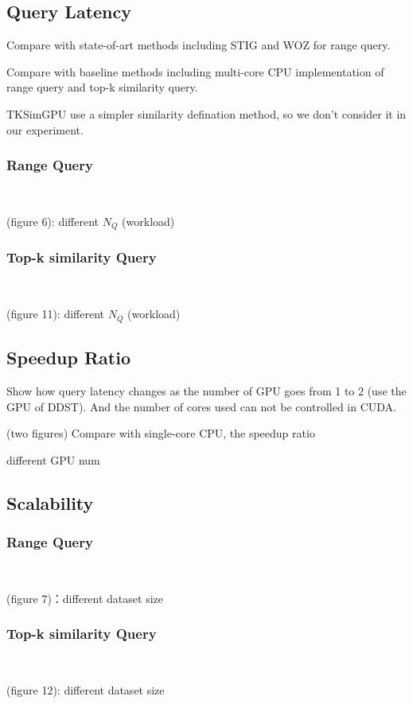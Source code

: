 \documentclass[conference]{IEEEtran}
\begin{document}
\subsection{Query Latency}

Compare with state-of-art methods including STIG and WOZ for range query.

Compare with baseline methods including multi-core CPU implementation of range query and top-k similarity query.

TKSimGPU use a simpler similarity defination method, so we don't consider it in our experiment. 

\subsubsection{Range Query}$  $

(figure 6): different $N_Q$ (workload)

\subsubsection{Top-k similarity Query}$  $

(figure 11): different $N_{Q}$ (workload)

\subsection{Speedup Ratio}
Show how query latency changes as the number of GPU goes from 1 to 2 (use the GPU of DDST). And the number of cores used can not be controlled in CUDA. 

(two figures) Compare with single-core CPU, the speedup ratio

different GPU num

\subsection{Scalability}

\subsubsection{Range Query}$  $

(figure 7)：different dataset size

\subsubsection{Top-k similarity Query}$  $

(figure 12): different dataset size
\end{document}
